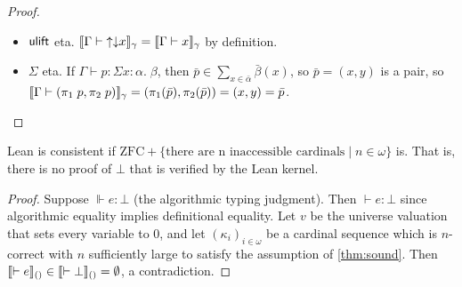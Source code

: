 \begin{proof}
\begin{itemize}
\begin{align*}
&=e(\bar x)(\bullet)(y\in\bar\alpha\mapsto(h\in[(y,x)\in\overline{\bar r}]\mapsto F(y))\\
&=e(\bar x)(\bar f)(y\in\bar\alpha\mapsto(h\in[(y,x)\in\overline{\bar r}]\mapsto F(y))\\
&=\scott{\Gamma\vdash e\;x\;f\;(\lambda (y:\alpha)\;(h:r\;y\;x).\;\rec_\acc\;e\;y\;(f\;y\;h))}_\gamma
\end{align*}
where $\bar f=\bullet$ because $f$ is a proof.
\item $\mathsf{ulift}$ eta. $\scott{\Gamma\vdash{\uparrow\downarrow}x}_\gamma=\scott{\Gamma\vdash x}_\gamma$ by definition.
\item $\Sigma$ eta. If $\Gamma\vdash p:\Sigma x:\alpha.\;\beta$, then $\bar p\in\sum_{x\in\bar\alpha}\bar\beta(x)$, so $\bar p=(x,y)$ is a pair, so  $\scott{\Gamma\vdash(\pi_1\;p,\pi_2\;p)}_\gamma=(\pi_1(\bar p),\pi_2(\bar p))=(x,y)=\bar p$.
\end{itemize}
\end{proof}

\begin{corollary}
Lean is consistent if $\mathrm{ZFC}+\{\mbox{there are n inaccessible cardinals}\mid n\in\omega\}$ is. That is, there is no proof of $\bot$ that is verified by the Lean kernel.
\end{corollary}
\begin{proof}
Suppose $\Vdash e:\bot$ (the algorithmic typing judgment). Then $\vdash e:\bot$ since algorithmic equality implies definitional equality. Let $v$ be the universe valuation that sets every variable to 0, and let $(\kappa_i)_{i\in\omega}$ be a cardinal sequence which is $n$-correct with $n$ sufficiently large to satisfy the assumption of \autoref{thm:sound}.  Then $\llbracket \vdash e\rrbracket_{()}\in\llbracket \vdash\bot\rrbracket_{()}=\emptyset$, a contradiction.
\end{proof}